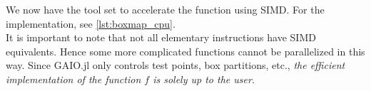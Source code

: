 We now have the tool set to accelerate the function  using SIMD. For 
the implementation, see \autoref{lst:boxmap_cpu}. \\

It is important to note that not all elementary instructions have SIMD equivalents. Hence 
some more complicated functions cannot be parallelized in this way. Since GAIO.jl only 
controls test points, box partitions, etc., \emph{
the efficient implementation of the function $f$ is solely up to the user.
}

